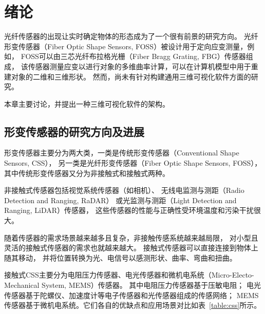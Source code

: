 \clearpage
\setcounter{page}{1}

\section{绪论}
\label{sec:intro}

光纤传感器的出现让实时确定物体的形态成为了一个很有前景的研究方向\cite{recent-dev-in-foss}。
光纤形变传感器（Fiber Optic Shape Sensors, FOSS）被设计用于定向应变测量，例如，
FOSS可以由三芯光纤布拉格光栅（Fiber Bragg Grating, FBG）传感器组成，
该传感器测量应变以进行对象的多维曲率计算，可以在计算机模型中用于重建对象的二维和三维形状。
然而，尚未有针对构建通用三维可视化软件方面的研究。

本章主要讨论，并提出一种三维可视化软件的架构。

\subsection{形变传感器的研究方向及进展}
\label{sec:ss}

形变传感器主要分为两大类，一类是传统形变传感器（Conventional Shape Sensors, CSS），
另一类是光纤形变传感器（Fiber Optic Shape Sensors, FOSS）， 
其中传统形变传感器又分为非接触式和接触式两种。

非接触式传感器包括视觉系统传感器（如相机）、
无线电监测与测距（Radio Detection and Ranging, RaDAR）
或光监测与测距（Light Detection and Ranging, LiDAR）传感器，
这些传感器的性能与正确性受环境温度和污染干扰很大。

随着传感器的需求场景越来越多且复杂，非接触传感系统越来越局限，
对小型且灵活的接触式传感器的需求也就越来越大。
接触式传感器可以直接连接到物体上随其移动，
并将位置转换为光、电信号以感测形状、曲率、弯曲和扭曲。

接触式CSS主要分为电阻压力传感器、电光传感器和微机电系统（Micro-Electo-Mechanical System, MEMS）传感器。
其中电阻压力传感器基于压敏电阻；
电光传感器基于陀螺仪、加速度计等电子传感器和光传感器组成的传感网络；
MEMS传感器基于微机电系统。它们各自的优缺点和应用场景对比如表~\ref{table:css}所示。

